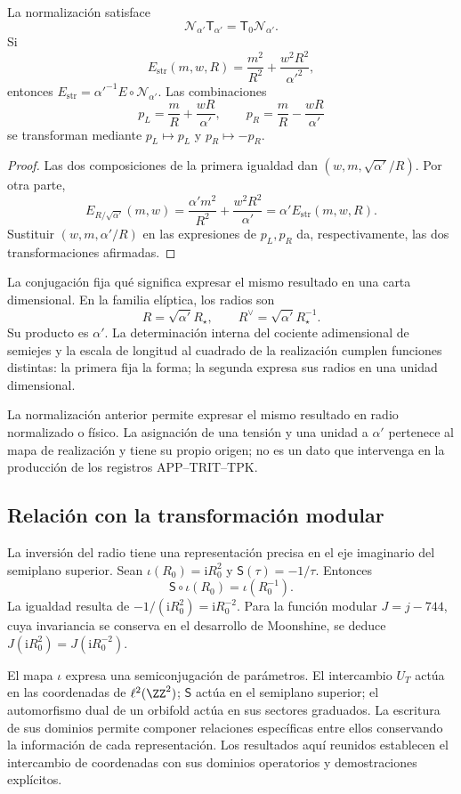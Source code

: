 \begin{theorem}
\label{x_reciprocidad:iv:thm:normalizacion-cuerda}
La normalización satisface
\[
 \mathcal N_{\alpha'}\mathsf T_{\alpha'}
 =\mathsf T_0\mathcal N_{\alpha'}.
\]
Si
\[
 E_{\mathrm{str}}(m,w,R)
 =\frac{m^2}{R^2}+\frac{w^2R^2}{\alpha'^2},
\]
entonces
\(E_{\mathrm{str}}=\alpha'^{-1}E\circ\mathcal N_{\alpha'}\).
Las combinaciones
\[
 p_L=\frac mR+\frac{wR}{\alpha'},\qquad
 p_R=\frac mR-\frac{wR}{\alpha'}
\]
se transforman mediante \(p_L\mapsto p_L\) y \(p_R\mapsto-p_R\).
\end{theorem}
\begin{proof}
Las dos composiciones de la primera igualdad dan
\((w,m,\sqrt{\alpha'}/R)\). Por otra parte,
\[
 E_{R/\sqrt{\alpha'}}(m,w)
 =\frac{\alpha'm^2}{R^2}+\frac{w^2R^2}{\alpha'}
 =\alpha'E_{\mathrm{str}}(m,w,R).
\]
Sustituir \((w,m,\alpha'/R)\) en las expresiones de
\(p_L,p_R\) da, respectivamente, las dos transformaciones
afirmadas.
\end{proof}

La conjugación fija qué significa expresar el mismo resultado en
una carta dimensional. En la familia elíptica, los radios son
\[
 R=\sqrt{\alpha'}R_\star,\qquad
 R^\vee=\sqrt{\alpha'}R_\star^{-1}.
\]
Su producto es \(\alpha'\). La determinación interna del cociente
adimensional de semiejes y la escala de longitud al cuadrado de la
realización cumplen funciones distintas: la primera fija la forma;
la segunda expresa sus radios en una unidad dimensional.

La normalización anterior permite expresar el mismo resultado en
radio normalizado o físico. La asignación de una tensión y una
unidad a \(\alpha'\) pertenece al mapa de realización y tiene
su propio origen; no es un dato que intervenga en la producción
de los registros APP--TRIT--TPK.

\subsection{Relación con la transformación modular}

La inversión del radio tiene una representación precisa en el
eje imaginario del semiplano superior. Sean
\(\iota(R_0)=\mathrm iR_0^2\) y
\(\mathsf S(\tau)=-1/\tau\). Entonces
\begin{equation}
 \mathsf S\circ\iota(R_0)=\iota(R_0^{-1}).
 \label{x_reciprocidad:iv:eq:semiconjugacion-modular}
\end{equation}
La igualdad resulta de
\(-1/(\mathrm iR_0^2)=\mathrm iR_0^{-2}\). Para la función
modular \(J=j-744\), cuya invariancia se conserva en el
desarrollo de Moonshine, se deduce
\(J(\mathrm iR_0^2)=J(\mathrm iR_0^{-2})\).

El mapa \(\iota\) expresa una semiconjugación de parámetros.
El intercambio \(U_T\) actúa en las coordenadas de
\(\ell^2(\ZZ^2)\); \(\mathsf S\) actúa en el semiplano
superior; el automorfismo dual de un orbifold actúa en sus
sectores graduados. La escritura de sus dominios permite
componer relaciones específicas entre ellos conservando la
información de cada representación. Los resultados aquí
reunidos establecen el intercambio de coordenadas con sus
dominios operatorios y demostraciones explícitos.
